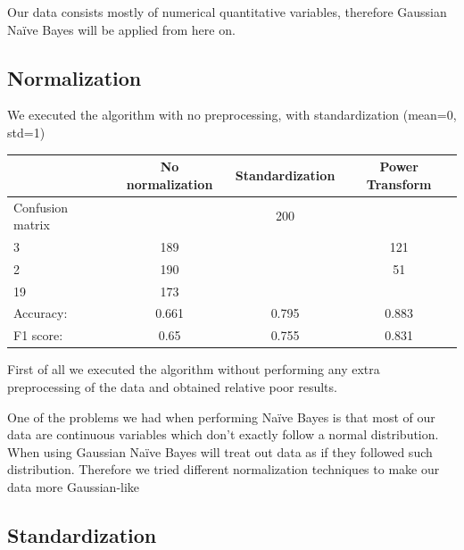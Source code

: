 Our data consists mostly of numerical quantitative variables, therefore Gaussian Na\"ive Bayes will be applied from here on.

\subsection{Normalization}

We executed the algorithm with no preprocessing, with standardization (mean=0, std=1) 

\begin{table}[H]
\centering
\begin{tabular}{lccc}
\toprule
    & No normalization & Standardization & Power Transform \\
    \midrule
    Confusion matrix & 
    \( \begin{bmatrix} 208 & 200 \\ 3 & 189 \end{bmatrix} \) & 
    \( \begin{bmatrix} 287 & 121 \\ 2 & 190\end{bmatrix} \) &
    \( \begin{bmatrix} 357 & 51 \\ 19 & 173\end{bmatrix} \)
    \\
    \addlinespace[0.5em]
    Accuracy: & 0.661 & 0.795 & 0.883 \\
    F1 score: & 0.65 & 0.755 & 0.831 \\
    \bottomrule
\end{tabular}
\end{table}


First of all we executed the algorithm without performing any extra preprocessing of the data and obtained
relative poor results.


One of the problems we had when performing Na\"ive Bayes is that most of our data are continuous variables
which don't exactly follow a normal distribution. When using Gaussian Na\"ive Bayes will treat out data 
as if they followed such distribution. Therefore we tried different normalization techniques to make our
data more Gaussian-like

\subsection{Standardization}

